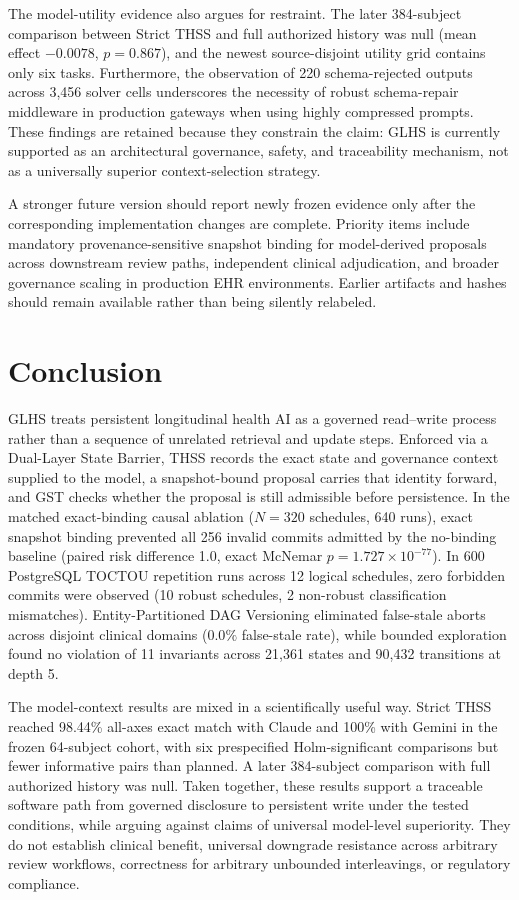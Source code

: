 \documentclass[11pt]{article}
\begin{document}
The model-utility evidence also argues for restraint. The later 384-subject comparison between Strict THSS and full authorized history was null (mean effect $-0.0078$, $p=0.867$), and the newest source-disjoint utility grid contains only six tasks. Furthermore, the observation of 220 schema-rejected outputs across 3,456 solver cells underscores the necessity of robust schema-repair middleware in production gateways when using highly compressed prompts. These findings are retained because they constrain the claim: GLHS is currently supported as an architectural governance, safety, and traceability mechanism, not as a universally superior context-selection strategy.

A stronger future version should report newly frozen evidence only after the corresponding implementation changes are complete. Priority items include mandatory provenance-sensitive snapshot binding for model-derived proposals across downstream review paths, independent clinical adjudication, and broader governance scaling in production EHR environments. Earlier artifacts and hashes should remain available rather than being silently relabeled.

\section{Conclusion}
GLHS treats persistent longitudinal health AI as a governed read--write process rather than a sequence of unrelated retrieval and update steps. Enforced via a Dual-Layer State Barrier, THSS records the exact state and governance context supplied to the model, a snapshot-bound proposal carries that identity forward, and GST checks whether the proposal is still admissible before persistence. In the matched exact-binding causal ablation ($N=320$ schedules, 640 runs), exact snapshot binding prevented all 256 invalid commits admitted by the no-binding baseline (paired risk difference 1.0, exact McNemar $p=1.727\times 10^{-77}$). In 600 PostgreSQL TOCTOU repetition runs across 12 logical schedules, zero forbidden commits were observed (10 robust schedules, 2 non-robust classification mismatches). Entity-Partitioned DAG Versioning eliminated false-stale aborts across disjoint clinical domains ($0.0\%$ false-stale rate), while bounded exploration found no violation of 11 invariants across 21,361 states and 90,432 transitions at depth 5.

The model-context results are mixed in a scientifically useful way. Strict THSS reached 98.44\% all-axes exact match with Claude and 100\% with Gemini in the frozen 64-subject cohort, with six prespecified Holm-significant comparisons but fewer informative pairs than planned. A later 384-subject comparison with full authorized history was null. Taken together, these results support a traceable software path from governed disclosure to persistent write under the tested conditions, while arguing against claims of universal model-level superiority. They do not establish clinical benefit, universal downgrade resistance across arbitrary review workflows, correctness for arbitrary unbounded interleavings, or regulatory compliance.
\end{document}

